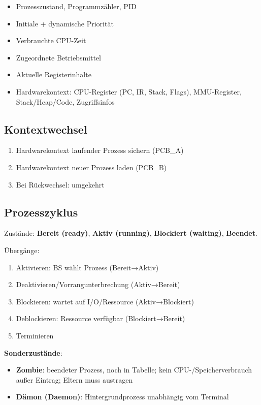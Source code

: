 \documentclass[11pt, a4paper]{article}
\begin{document}
\begin{itemize}
  \item Prozesszustand, Programmzähler, PID
  \item Initiale + dynamische Priorität
  \item Verbrauchte CPU-Zeit
  \item Zugeordnete Betriebsmittel
  \item Aktuelle Registerinhalte
  \item Hardwarekontext: CPU-Register (PC, IR, Stack, Flags), MMU-Register, Stack/Heap/Code, Zugriffsinfos
\end{itemize}


\subsection{Kontextwechsel}
\begin{enumerate}
  \item Hardwarekontext laufender Prozess sichern (PCB\_A)
  \item Hardwarekontext neuer Prozess laden (PCB\_B)
  \item Bei Rückwechsel: umgekehrt
\end{enumerate}


\subsection{Prozesszyklus}

Zustände: \textbf{Bereit (ready)}, \textbf{Aktiv (running)}, \textbf{Blockiert (waiting)}, \textbf{Beendet}.


Übergänge:

\begin{enumerate}
  \item Aktivieren: BS wählt Prozess (Bereit→Aktiv)
  \item Deaktivieren/Vorrangunterbrechung (Aktiv→Bereit)
  \item Blockieren: wartet auf I/O/Ressource (Aktiv→Blockiert)
  \item Deblockieren: Ressource verfügbar (Blockiert→Bereit)
  \item Terminieren
\end{enumerate}

\textbf{Sonderzustände}:

\begin{itemize}
  \item \textbf{Zombie}: beendeter Prozess, noch in Tabelle; kein CPU-/Speicherverbrauch außer Eintrag; Eltern muss austragen
  \item \textbf{Dämon (Daemon)}: Hintergrundprozess unabhängig vom Terminal
\end{itemize}
\end{document}
